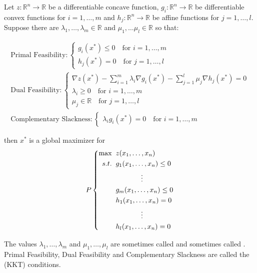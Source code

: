 \begin{theorem} Let $z : \mathbb{R}^n \rightarrow \mathbb{R}$ be a differentiable concave  function, $g_i:\mathbb{R}^n \rightarrow \mathbb{R}$ be differentiable convex functions for $i = 1,\dots,m$ and $h_j:\mathbb{R}^n \rightarrow \mathbb{R}$ be affine functions for $j=1,\dots,l$. Suppose there are $\lambda_1,\dots,\lambda_m \in \mathbb{R}$ and $\mu_1,\dots\mu_l \in \mathbb{R}$ so that:

\begin{gather*}
\text{Primal Feasibility}: \left\{
\begin{aligned}
g_i({x}^*) \leq 0 \quad \text{for $i = 1,\dots,m$}\\
h_j({x}^*) = 0 \quad \text{for $j = 1,\dots,l$}
\end{aligned}
\right.\\
\text{Dual Feasibility}:\left\{
\begin{aligned}
\nabla z({x}^*) - \sum_{i = 1}^m\lambda_i\nabla g_i({x}^*) - \sum_{j = 1}^{l}\mu_j\nabla h_j({x}^*) = {0}\\
\lambda_i \geq 0 \quad \text{for $i=1,\dots,m$}\\
\mu_j \in \mathbb{R} \quad \text{for $j = 1,\dots,l$}
\end{aligned}
\right.\\
\text{Complementary Slackness}:\left\{
\begin{aligned}
\lambda_ig_i({x}^*) = 0 \quad \text{for $i = 1,\dots,m$}
\end{aligned}
\right.
\end{gather*}

then ${x}^*$ is a global maximizer for 
\begin{displaymath}
P\left\{
\begin{aligned}
\max\;\;& z(x_1,\dots,x_n)\\
s.t.\;\;& g_1(x_1,\dots,x_n) \leq 0\\
& \hspace*{0.5in}\vdots\\
& g_m(x_1,\dots,x_n) \leq 0\\
& h_1(x_1,\dots,x_n) = 0\\
&\hspace*{0.5in}\vdots\\
&h_l(x_1,\dots,x_n) = 0
\end{aligned}
\right.
\end{displaymath}
\label{thm:KKT8}
\end{theorem}

The values $\lambda_1,\dots,\lambda_m$ and $\mu_1,\dots,\mu_l$ are sometimes called  and sometimes called . Primal Feasibility, Dual Feasibility and Complementary Slackness are called the  (KKT) conditions.

